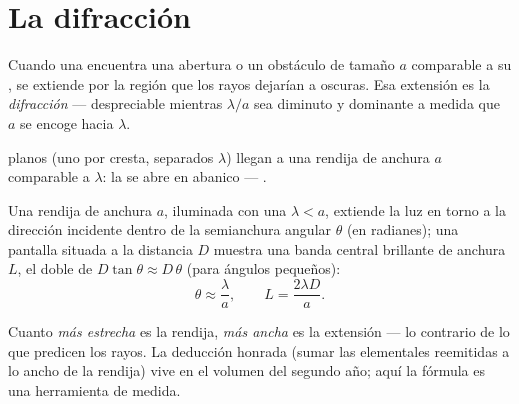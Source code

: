 \section{La difracción}

\begin{definition}[Difracción]\label{def:g12:light-as-wave:diffraction}
Cuando una  encuentra una abertura o un obstáculo de tamaño $a$
comparable a su , se extiende por la región que los
rayos dejarían a oscuras. Esa extensión es la
\emph{difracción} --- despreciable mientras
$\lambda/a$ sea diminuto y dominante a medida que $a$ se encoge hacia
$\lambda$.
\end{definition}

\begin{omfigure}

{\small {} planos (uno por cresta, separados $\lambda$)
llegan a una rendija de anchura $a$ comparable a $\lambda$: la  se
abre en abanico --- .}
\end{omfigure}

\begin{proposition}\label{prop:g12:light-as-wave:halfwidth}
Una rendija de anchura $a$, iluminada con una 
$\lambda < a$, extiende la luz en torno a la dirección incidente dentro
de la semianchura angular $\theta$ (en radianes); una pantalla situada
a la distancia $D$ muestra una banda central brillante de anchura $L$,
el doble de $D \tan\theta \approx D\,\theta$ (para ángulos pequeños):
\[
\theta \approx \frac{\lambda}{a}, \qquad L = \frac{2\lambda D}{a}.
\]
\end{proposition}
\admitted

\begin{remark}\label{rem:g12:light-as-wave:honest}
Cuanto \emph{más estrecha} es la rendija, \emph{más ancha} es la
extensión --- lo contrario de lo que predicen los rayos. La deducción
honrada (sumar las  elementales reemitidas a lo ancho de la
rendija) vive en el volumen del segundo año; aquí la fórmula es una
herramienta de medida.
\end{remark}


